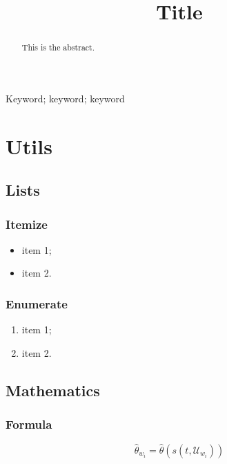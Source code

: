 \documentclass[]{interact}
\theoremstyle{plain}
\theoremstyle{definition}
\theoremstyle{remark}
\begin{document}

\title{Title}

\author{
}

\maketitle

\begin{abstract}
  This is the abstract.
\end{abstract}

\begin{keywords}
  Keyword; keyword; keyword
\end{keywords}

\section{Utils}

\subsection{Lists}

\subsubsection{Itemize}
\begin{itemize}
  \item item 1;
  \item item 2.
\end{itemize}

\subsubsection{Enumerate}
\begin{enumerate}
  \item item 1;
  \item item 2.
\end{enumerate}

\subsection{Mathematics}

\subsubsection{Formula}
\begin{equation}
  \hat{\theta}_{w_i} = \hat{\theta}(s(t,\mathcal{U}_{w_i}))
\end{equation}
\end{document}
